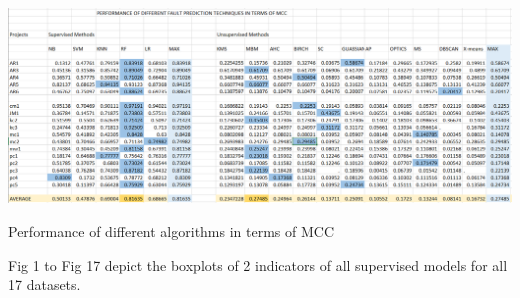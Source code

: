 \begin{center}
 \includegraphics[scale=.5,keepaspectratio=true]{./mcc}
\end{center}
\begin{table}[]
    \centering
    \caption{Performance of different algorithms in terms of MCC}
\end{table}

\pagebreak

\noindent Fig 1 to Fig 17 depict the boxplots of 2 indicators of all supervised models for all 17 datasets.\newline

